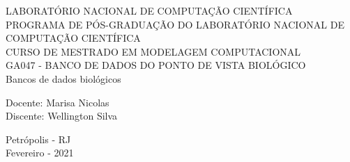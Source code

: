 \begin{center} 
{\large LABORATÓRIO NACIONAL DE COMPUTAÇÃO CIENTÍFICA}\\[0.2cm] 
{\large PROGRAMA DE PÓS-GRADUAÇÃO DO LABORATÓRIO NACIONAL DE COMPUTAÇÃO CIENTÍFICA}\\[0.2cm]
{\large CURSO DE MESTRADO EM MODELAGEM COMPUTACIONAL}\\[0.2cm]
{\large GA047 - BANCO DE DADOS DO PONTO   DE VISTA BIOLÓGICO}\\[7cm] 
{ \huge Bancos de dados biológicos} \\[7cm] %
\end{center}
{\large Docente: Marisa Nicolas} \\[0.2cm]
{\large Discente: Wellington Silva}\\[2cm]
\begin{center}
{\large Petrópolis - RJ}\\[0.2cm]
{\large Fevereiro - 2021}
\end{center}
